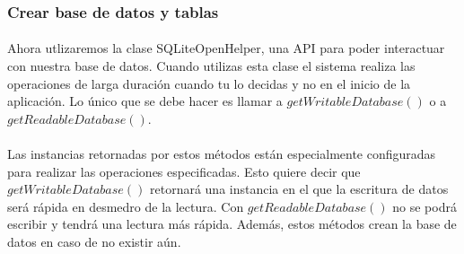 \documentclass[10pt]{extarticle}
\begin{document}
\subsubsection{Crear base de datos y tablas}

\paragraph{}
Ahora utlizaremos la clase SQLiteOpenHelper, una API para poder interactuar con nuestra base de datos. Cuando utilizas esta clase el sistema realiza las operaciones de larga duración cuando tu lo decidas y no en el inicio de la aplicación. Lo único que se debe hacer es llamar a $getWritableDatabase()$ o a $getReadableDatabase()$. 
\paragraph{}
Las instancias retornadas por estos métodos están especialmente configuradas para realizar las operaciones especificadas. Esto quiere decir que $getWritableDatabase()$ retornará una instancia en el que la escritura de datos será rápida en desmedro de la lectura. Con $getReadableDatabase()$ no se podrá escribir y tendrá una lectura más rápida. Además, estos métodos crean la base de datos en caso de no existir aún.
\end{document}
